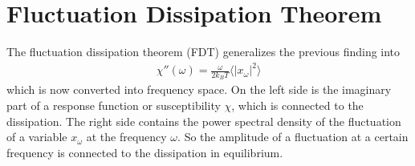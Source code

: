\documentclass[letterpaper,10pt,english]{sphinxmanual}
\begin{document}
\section{Fluctuation Dissipation Theorem}
\label{\detokenize{notebooks/L16/1_langevin:Fluctuation-Dissipation-Theorem}}
\sphinxAtStartPar
The fluctuation dissipation theorem (FDT) generalizes the previous finding into
\begin{equation*}
\begin{split}\chi''(\omega)=\frac{\omega}{2k_B T}\langle |x_{\omega}|^2\rangle \tag{Fluctuation dissipation relation}\end{split}
\end{equation*}
\sphinxAtStartPar
which is now converted into frequency space. On the left side is the imaginary part of a response function or susceptibility \(\chi\), which is connected to the dissipation. The right side contains the power spectral density of the fluctuation of a variable \(x_{\omega}\) at the frequency \(\omega\). So the amplitude of a fluctuation at a certain frequency is connected to the dissipation in equilibrium.
\end{document}
